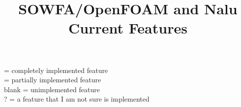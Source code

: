 \documentclass{article}
\begin{document}
\title{SOWFA/OpenFOAM and Nalu Current Features}
\maketitle




\noindent
\CIRCLE = completely implemented feature \\
\LEFTcircle = partially implemented feature \\
blank = unimplemented feature \\
? = a feature that I am not sure is implemented \\
\end{document}
